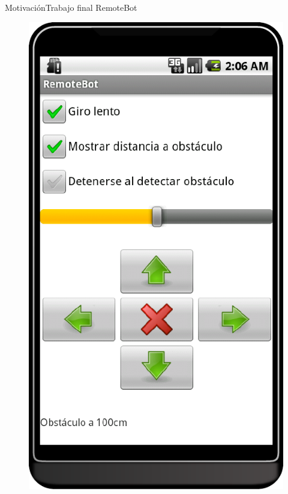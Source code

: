 \documentclass{beamer}
\begin{document}
\begin{frame}{Motivación}{Trabajo final RemoteBot}
\begin{minipage}{0.3\linewidth}
\begin{figure}
            \includegraphics[width=\linewidth]{images/remotebot4android}
        \end{figure}
    \end{minipage}
\end{frame}
\end{document}
